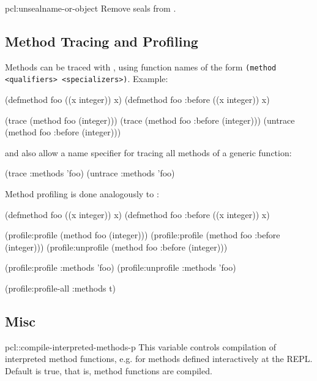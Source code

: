 \begin{defun}{pcl:}{unseal}{name-or-object}
  Remove seals from .
\end{defun}



\subsection{Method Tracing and Profiling}

Methods can be traced with , using function names of the
form \verb|(method <qualifiers> <specializers>)|.  Example:

\begin{example}
(defmethod foo ((x integer)) x)
(defmethod foo :before ((x integer)) x)

(trace (method foo (integer)))
(trace (method foo :before (integer)))
(untrace (method foo :before (integer)))
\end{example}
  
 and  also allow a name specifier
 for tracing all methods of a generic function:

\begin{example}
(trace :methods 'foo)
(untrace :methods 'foo)
\end{example}

Method profiling is done analogously to :

\begin{example}
(defmethod foo ((x integer)) x)
(defmethod foo :before ((x integer)) x)

(profile:profile (method foo (integer)))
(profile:profile (method foo :before (integer)))
(profile:unprofile (method foo :before (integer)))

(profile:profile :methods 'foo)
(profile:unprofile :methods 'foo)

(profile:profile-all :methods t)
\end{example}



\subsection{Misc}

\begin{defvar}{pcl::}{compile-interpreted-methods-p}
  This variable controls compilation of interpreted method functions,
  e.g. for methods defined interactively at the REPL.  Default is
  true, that is, method functions are compiled.
\end{defvar}






